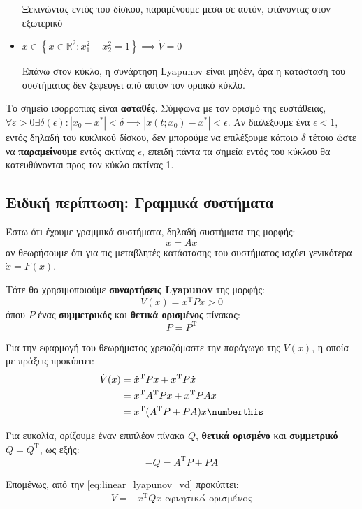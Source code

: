 \documentclass[11pt,a4paper,notitlepage,fleqn]{article}
\begin{document}
\begin{exercise}
\begin{itemize}
		Ξεκινώντας εντός του δίσκου, παραμένουμε μέσα σε αυτόν, φτάνοντας στον
		εξωτερικό
		\item \( x \in \left\lbrace x \in \mathbb R^2 : x_1^2+x_2^2 = 1 \right\rbrace
		\implies \dot V = 0
		\)

		Επάνω στον κύκλο, η συνάρτηση Lyapunov είναι μηδέν, άρα η κατάσταση του
		συστήματος δεν ξεφεύγει από αυτόν τον οριακό κύκλο.
	\end{itemize}

	Το σημείο ισορροπίας είναι \textbf{ασταθές}. Σύμφωνα με τον ορισμό της ευστάθειας,
	\( \forall \varepsilon > 0 \exists \delta(\epsilon) :
	|x_0-x^*| < \delta \implies |x(t;x_0)-x^*| < \epsilon \). Αν διαλέξουμε ένα
	\( \epsilon < 1 \), εντός δηλαδή του κυκλικού δίσκου, δεν μπορούμε να επιλέξουμε
	κάποιο
	\( \delta \) τέτοιο ώστε να \textbf{παραμείνουμε} εντός ακτίνας \( \epsilon \),
	επειδή πάντα τα σημεία εντός του κύκλου θα κατευθύνονται προς τον κύκλο ακτίνας 1.
\end{exercise}

\subsection{Ειδική περίπτωση: Γραμμικά συστήματα}
\label{sec:linear_lyapunov}
Έστω ότι έχουμε γραμμικά συστήματα, δηλαδή συστήματα της μορφής:
\[
\dot x = Ax
\]
αν θεωρήσουμε ότι για τις μεταβλητές κατάστασης του συστήματος ισχύει γενικότερα
\( \dot x = F(x) \).

Τότε θα χρησιμοποιούμε \textbf{συναρτήσεις Lyapunov} της μορφής:
\[
V(x) = x^{\mathrm T} P x > 0
\]
όπου \( P \) ένας \textbf{συμμετρικός} και \textbf{θετικά ορισμένος} πίνακας:
\[
P = P^{\mathrm{T}}
\]

Για την εφαρμογή του θεωρήματος χρειαζόμαστε την παράγωγο της \( V(x) \), η οποία
με πράξεις προκύπτει:
\begin{align*}
	\dot V(x) &= \dot x^{\mathrm T} P x + x^{\mathrm T} P \dot x \\
	&= x^{\mathrm T} A^{\mathrm T} P x + x^{\mathrm T} P A x \\
	&= x^{\mathrm T}(A^{\mathrm T}P + PA)x
	\numberthis
	\label{eq:linear_lyapunov_vd}
\end{align*}

Για ευκολία, ορίζουμε έναν επιπλέον πίνακα \( Q \), \textbf{θετικά ορισμένο} και
\textbf{συμμετρικό} \( Q = Q^{\mathrm T} \), ως εξής:
\[
-Q = A^{\mathrm T}P + PA
\]

Επομένως, από την \eqref{eq:linear_lyapunov_vd} προκύπτει:
\[
\dot V = -x^{\mathrm T} Q x \text{ αρνητικά ορισμένος}
\]
\end{document}
